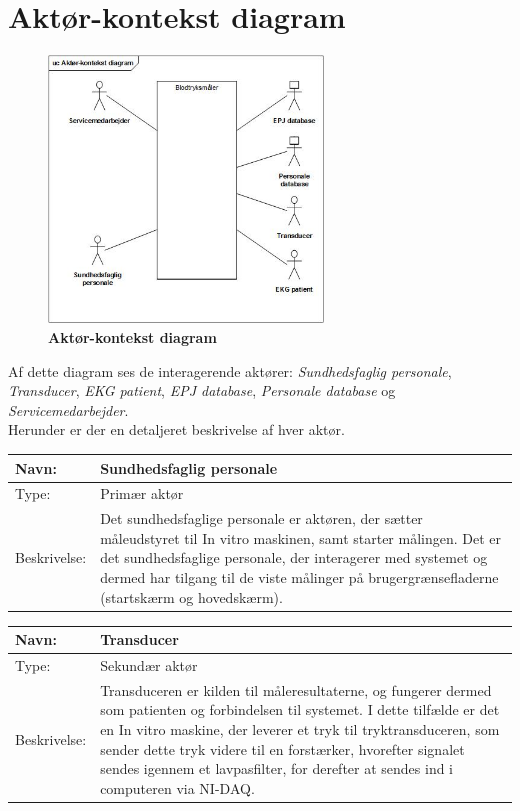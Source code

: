 \section{Aktør-kontekst diagram}
\begin{figure}[h!]
\includegraphics[width =0.65\textwidth , center]{billeder/Aktorkontekst.jpg}
\caption{\textbf{Aktør-kontekst diagram}}
\end{figure}
Af dette diagram ses de interagerende aktører: \textit{Sundhedsfaglig personale}, \textit{Transducer}, \textit{EKG patient}, \textit{EPJ database}, \textit{Personale database} og \textit{Servicemedarbejder}.\\ Herunder er der en detaljeret beskrivelse af hver aktør.
\begin{table}[h!]
\begin{tabular}{| >{\raggedright\arraybackslash}p{3cm} | >{\raggedright\arraybackslash}p{12cm} |}
   \hline
   Navn: & Sundhedsfaglig personale\\ \hline
   Type: & Primær aktør \\ \hline
   Beskrivelse: & Det sundhedsfaglige personale er aktøren, der sætter måleudstyret til In vitro maskinen, samt starter målingen. Det er det sundhedsfaglige personale, der interagerer med systemet og dermed har tilgang til de viste målinger på brugergrænsefladerne (startskærm og hovedskærm).\\ \hline
\end{tabular}
\end{table}
\begin{table}[h!]
\begin{tabular}{| >{\raggedright\arraybackslash}p{3cm} | >{\raggedright\arraybackslash}p{12cm} |}
   \hline
   Navn: & Transducer\\ \hline
   Type: & Sekundær aktør \\ \hline
   Beskrivelse: & Transduceren er kilden til måleresultaterne, og fungerer dermed som patienten og forbindelsen til systemet. I dette tilfælde er det en In vitro maskine, der leverer et tryk til tryktransduceren, som sender dette tryk videre til en forstærker, hvorefter signalet sendes igennem et lavpasfilter, for derefter at sendes ind i computeren via NI-DAQ.\\ \hline
\end{tabular}
\end{table}
